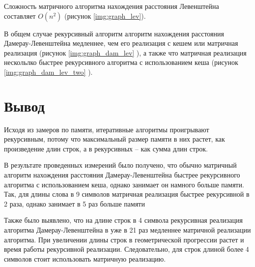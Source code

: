 \clearpage

Сложность матричного алгоритма нахождения расстояния Левенштейна составляет $O(n^2)$ (рисунок \ref{img:graph_lev}).

В общем случае рекурсивный алгоритм алгоритм нахождения расстояния Дамерау-Левенштейна медленнее, чем его реализация с кешем или матричная реализация (рисунок \ref{img:graph_dam_lev} ), а также что матричная реализация нескольлко быстрее рекурсивного алгоритма с использованием кеша (рисунок \ref{img:graph_dam_lev_two} ).


\section{Вывод}

Исходя из замеров по памяти, итеративные алгоритмы проигрывают рекурсивным, потому что максимальный размер памяти в них растет, как произведение длин строк, а в рекурсивных -- как сумма длин строк.

В результате проведенных измерений было получено, что обычно матричный алгоритм нахождения расстояния Дамерау-Левенштейна быстрее рекурсивного алгоритма с использованием кеша, однако занимает он намного больше памяти. Так, для длины слова в 9 символов матричная реализация быстрее рекурсивной в 2 раза, однако занимает в 5 раз больше памяти

Также было выявлено, что на длине строк в 4 символа рекурсивная реализация алгоритма Дамерау-Левенштейна в уже в 21 раз медленнее матричной реализации алгоритма. При увеличении длины строк в геометрической прогрессии растет и время работы рекурсивной реализации. Следовательно, для строк длиной более 4 символов стоит использовать матричную реализацию.

